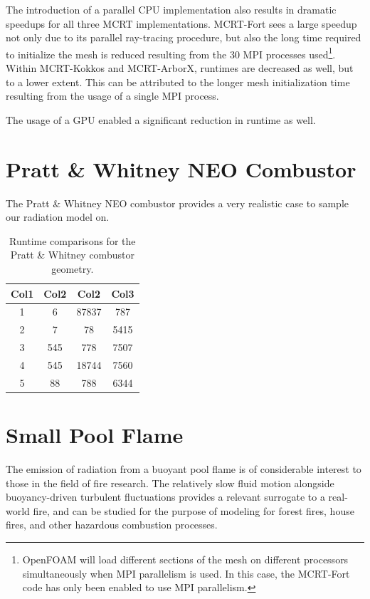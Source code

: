 The introduction of a parallel CPU implementation also results in dramatic speedups for all three MCRT implementations. MCRT-Fort sees a large speedup not only due to its parallel ray-tracing procedure, but also the long time required to initialize the mesh is reduced resulting from the 30 MPI processes used\footnote{OpenFOAM will load different sections of the mesh on different processors simultaneously when MPI parallelism is used. In this case, the MCRT-Fort code has only been enabled to use MPI parallelism.}.
Within MCRT-Kokkos and MCRT-ArborX, runtimes are decreased as well, but to a lower extent. This can be attributed to the longer mesh initialization time resulting from the usage of a single MPI process.

The usage of a GPU enabled a significant reduction in runtime as well. 



\section{Pratt \& Whitney NEO Combustor}
The Pratt \& Whitney NEO combustor provides a very realistic case to sample our radiation model on.

\begin{table}[h!]
\centering
\begin{tabular}{||c c c c||} 
 \hline
 Col1 & Col2 & Col2 & Col3 \\ [0.5ex] 
 \hline\hline
 1 & 6 & 87837 & 787 \\ 
 2 & 7 & 78 & 5415 \\
 3 & 545 & 778 & 7507 \\
 4 & 545 & 18744 & 7560 \\
 5 & 88 & 788 & 6344 \\ [1ex] 
 \hline
\end{tabular}
\caption{Runtime comparisons for the Pratt \& Whitney combustor geometry.}
\label{table:PW_runtime_table}
\end{table}


\section{Small Pool Flame}
The emission of radiation from a buoyant pool flame is of considerable interest to those in the field of fire research. 
The relatively slow fluid motion alongside buoyancy-driven turbulent fluctuations provides a relevant surrogate to a real-world fire, and can be studied for the purpose of modeling for forest fires, house fires, and other hazardous combustion processes.

